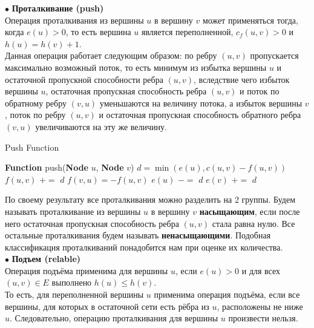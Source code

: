     $\bullet$ \textbf{Проталкивание (push)}\\
    Операция проталкивания из вершины $u$ в вершину $v$ может применяться тогда, когда $e(u)>0$, то есть вершина $u$ является переполненной, $c_f(u,v)>0$ и $h(u)=h(v)+1$.\\

    Данная операция работает следующим образом: по ребру $(u,v)$ пропускается максимально возможный поток, то есть минимум из избытка вершины $u$ и остаточной пропускной способности ребра $(u,v)$, вследствие чего избыток вершины $u$, остаточная пропускная способность ребра $(u,v)$ и поток по обратному ребру $(v,u)$ уменьшаются на величину потока, а избыток вершины $v$, поток по ребру $(u,v)$ и остаточная пропускная способность обратного ребра $(v,u)$ увеличиваются на эту же величину.

    \begin{algorithm}
    \caption{Push Function}
        \begin{algorithmic}
        \STATE \textbf{Function} push(\textbf{Node} $u$, \textbf{Node} $v$)
            \STATE \quad \quad $d = \min(e(u), c(u, v) - f(u, v))$
            \STATE \quad \quad $f(u, v)$ $+=$ $d$
            \STATE \quad \quad $f(v, u) = -f(u, v)$
            \STATE \quad \quad $e(u) $ $-=$ $ d$
            \STATE \quad \quad $e(v) $ $+=$ $ d$
        \end{algorithmic}
    \end{algorithm}

    По своему результату все проталкивания можно разделить на 2 группы. Будем называть проталкивание из вершины $u$ в вершину $v$ \textbf{насыщающим}, если после него остаточная пропускная способность ребра $(u,v)$ стала равна нулю. Все остальные проталкивания будем называть \textbf{ненасыщающими}. Подобная классификация проталкиваний понадобится нам при оценке их количества.\\


    $\bullet$ \textbf{Подъем (relable)}\\
    Операция подъёма применима для вершины $u$, если $e(u) > 0$ и для всех $(u,v) \in E$ выполнено $h(u) \leq h(v)$.\\

    То есть, для переполненной вершины $u$ применима операция подъёма, если все вершины, для которых в остаточной сети есть рёбра из $u$, расположены не ниже $u$. Следовательно, операцию проталкивания для вершины $u$ произвести нельзя.\\
    
